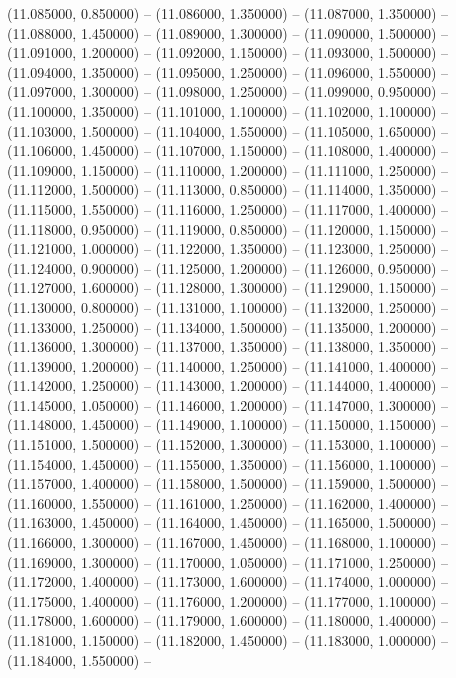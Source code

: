 (11.085000, 0.850000) -- 
(11.086000, 1.350000) -- 
(11.087000, 1.350000) -- 
(11.088000, 1.450000) -- 
(11.089000, 1.300000) -- 
(11.090000, 1.500000) -- 
(11.091000, 1.200000) -- 
(11.092000, 1.150000) -- 
(11.093000, 1.500000) -- 
(11.094000, 1.350000) -- 
(11.095000, 1.250000) -- 
(11.096000, 1.550000) -- 
(11.097000, 1.300000) -- 
(11.098000, 1.250000) -- 
(11.099000, 0.950000) -- 
(11.100000, 1.350000) -- 
(11.101000, 1.100000) -- 
(11.102000, 1.100000) -- 
(11.103000, 1.500000) -- 
(11.104000, 1.550000) -- 
(11.105000, 1.650000) -- 
(11.106000, 1.450000) -- 
(11.107000, 1.150000) -- 
(11.108000, 1.400000) -- 
(11.109000, 1.150000) -- 
(11.110000, 1.200000) -- 
(11.111000, 1.250000) -- 
(11.112000, 1.500000) -- 
(11.113000, 0.850000) -- 
(11.114000, 1.350000) -- 
(11.115000, 1.550000) -- 
(11.116000, 1.250000) -- 
(11.117000, 1.400000) -- 
(11.118000, 0.950000) -- 
(11.119000, 0.850000) -- 
(11.120000, 1.150000) -- 
(11.121000, 1.000000) -- 
(11.122000, 1.350000) -- 
(11.123000, 1.250000) -- 
(11.124000, 0.900000) -- 
(11.125000, 1.200000) -- 
(11.126000, 0.950000) -- 
(11.127000, 1.600000) -- 
(11.128000, 1.300000) -- 
(11.129000, 1.150000) -- 
(11.130000, 0.800000) -- 
(11.131000, 1.100000) -- 
(11.132000, 1.250000) -- 
(11.133000, 1.250000) -- 
(11.134000, 1.500000) -- 
(11.135000, 1.200000) -- 
(11.136000, 1.300000) -- 
(11.137000, 1.350000) -- 
(11.138000, 1.350000) -- 
(11.139000, 1.200000) -- 
(11.140000, 1.250000) -- 
(11.141000, 1.400000) -- 
(11.142000, 1.250000) -- 
(11.143000, 1.200000) -- 
(11.144000, 1.400000) -- 
(11.145000, 1.050000) -- 
(11.146000, 1.200000) -- 
(11.147000, 1.300000) -- 
(11.148000, 1.450000) -- 
(11.149000, 1.100000) -- 
(11.150000, 1.150000) -- 
(11.151000, 1.500000) -- 
(11.152000, 1.300000) -- 
(11.153000, 1.100000) -- 
(11.154000, 1.450000) -- 
(11.155000, 1.350000) -- 
(11.156000, 1.100000) -- 
(11.157000, 1.400000) -- 
(11.158000, 1.500000) -- 
(11.159000, 1.500000) -- 
(11.160000, 1.550000) -- 
(11.161000, 1.250000) -- 
(11.162000, 1.400000) -- 
(11.163000, 1.450000) -- 
(11.164000, 1.450000) -- 
(11.165000, 1.500000) -- 
(11.166000, 1.300000) -- 
(11.167000, 1.450000) -- 
(11.168000, 1.100000) -- 
(11.169000, 1.300000) -- 
(11.170000, 1.050000) -- 
(11.171000, 1.250000) -- 
(11.172000, 1.400000) -- 
(11.173000, 1.600000) -- 
(11.174000, 1.000000) -- 
(11.175000, 1.400000) -- 
(11.176000, 1.200000) -- 
(11.177000, 1.100000) -- 
(11.178000, 1.600000) -- 
(11.179000, 1.600000) -- 
(11.180000, 1.400000) -- 
(11.181000, 1.150000) -- 
(11.182000, 1.450000) -- 
(11.183000, 1.000000) -- 
(11.184000, 1.550000) -- 
